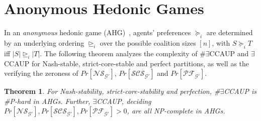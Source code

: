 \documentclass[letterpaper]{article} %
\newtheorem{theorem}{Theorem}
\newtheorem{remark}{Remark}
\begin{document}


\section{Anonymous Hedonic Games}
\label{sec:Anonymous Hedonic Games}
In an \textit{anonymous} hedonic game (AHG)~\cite{ballester2004np}, agents’ preferences $\succeq_i$ are determined by an underlying ordering $\unrhd_i$ over the possible coalition sizes $[n]$, with $S \succeq_i T$ iff $|S| \unrhd_i |T|$. The following theorem analyzes the complexity of \#$\exists$CCAUP and $\exists$CCAUP for Nash-stable, strict-core-stable and perfect partitions, as well as the verifying the zeroness of $Pr[\mathcal{NS}_{\mathcal{G}'}]$, $Pr[\mathcal{SCS}_{\mathcal{G}'}]$ and $Pr[\mathcal{PF}_{\mathcal{G}'}]$.
\begin{theorem}
\label{theorem:Nash-stable-anonymous}
For Nash-stability, strict-core-stability and perfection, \#$\exists$CCAUP is \#P-hard in AHGs. Further, $\exists$CCAUP, deciding $Pr[\mathcal{NS}_{\mathcal{G}'}], Pr[\mathcal{SCS}_{\mathcal{G}'}], Pr[\mathcal{PF}_{\mathcal{G}'}] > 0$, are all NP-complete in AHGs.
\end{theorem}
\end{document}
